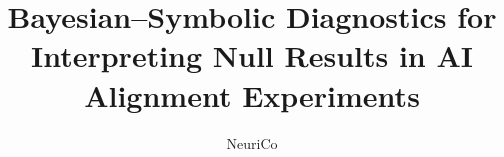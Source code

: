 \documentclass{article}
\title{Bayesian--Symbolic Diagnostics for Interpreting Null Results
in AI Alignment Experiments}
\author{NeuriCo}
\begin{document}
\maketitle

\begin{abstract}

\end{abstract}









\end{document}
